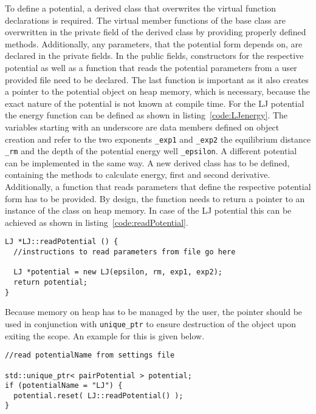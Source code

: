 To define a potential, a derived class that overwrites the virtual function
declarations is required. The virtual member functions of the base class are
overwritten in the private field of the derived class by providing properly
defined methods. Additionally, any parameters, that the potential form depends
on, are declared in the private fields. In the public fields, constructors for
the respective potential as well as a function that reads the potential
parameters from a user provided file need to be declared. The last function is
important as it also creates a pointer to the potential object on heap memory,
which is necessary, because the exact nature of the potential is not known at
compile time. For the \ac{LJ} potential the energy function can be defined as
shown in listing~\ref{code:LJenergy}. The variables starting with an underscore
are data members defined on object creation and refer to the two exponents
\texttt{\_exp1} and \texttt{\_exp2} the equilibrium distance \texttt{\_rm} and
the depth of the potential energy well \texttt{\_epsilon}. A different potential
can be implemented in the same way. A new derived class has to be defined,
containing the methods to calculate energy, first and second derivative.
Additionally, a function that reads parameters that define the respective
potential form has to be provided. By design, the function needs to return a
pointer to an instance of the class on heap memory. In case of the \ac{LJ}
potential this can be achieved as shown in listing~\ref{code:readPotential}.
%
\begin{lstlisting}[caption={Minimal example for the method \texttt{readPotential()}.},label=code:readPotential,float=htb]
LJ *LJ::readPotential () {
  //instructions to read parameters from file go here

  LJ *potential = new LJ(epsilon, rm, exp1, exp2);
  return potential;
}
\end{lstlisting}
%
Because memory on heap has to be managed by the user, the pointer should be used
in conjunction with \verb|unique_ptr| to ensure destruction of the object upon
exiting the scope. An example for this is given below.
%
\begin{lstlisting}
//read potentialName from settings file

std::unique_ptr< pairPotential > potential;
if (potentialName = "LJ") {
  potential.reset( LJ::readPotential() );
}
\end{lstlisting}

